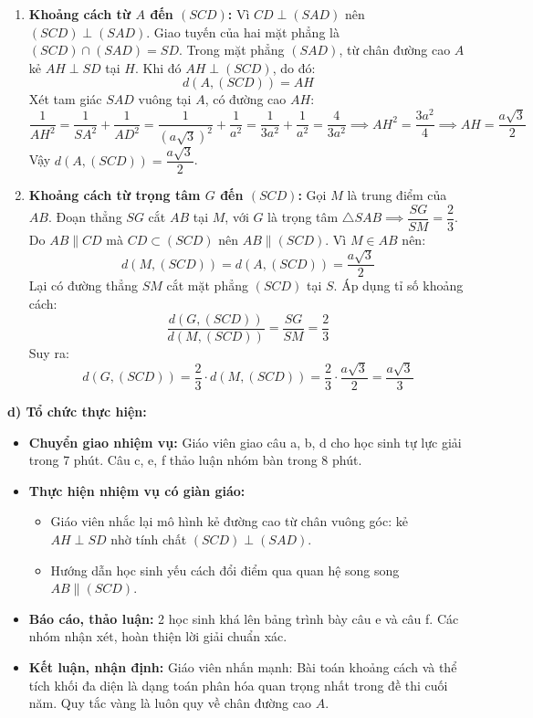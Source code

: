 \documentclass[12pt, a4paper]{article}
\begin{document}
\begin{enumerate}[label=\alph*)]
    \item \textbf{Khoảng cách từ $A$ đến $(SCD)$:}
    Vì $CD \perp (SAD)$ nên $(SCD) \perp (SAD)$. Giao tuyến của hai mặt phẳng là $(SCD) \cap (SAD) = SD$.
    Trong mặt phẳng $(SAD)$, từ chân đường cao $A$ kẻ $AH \perp SD$ tại $H$.
    Khi đó $AH \perp (SCD)$, do đó:
    $$d(A, (SCD)) = AH$$
    Xét tam giác $SAD$ vuông tại $A$, có đường cao $AH$:
    $$\dfrac{1}{AH^2} = \dfrac{1}{SA^2} + \dfrac{1}{AD^2} = \dfrac{1}{(a\sqrt{3})^2} + \dfrac{1}{a^2} = \dfrac{1}{3a^2} + \dfrac{1}{a^2} = \dfrac{4}{3a^2} \implies AH^2 = \dfrac{3a^2}{4} \implies AH = \dfrac{a\sqrt{3}}{2}$$
    Vậy $d(A, (SCD)) = \dfrac{a\sqrt{3}}{2}$.

    \item \textbf{Khoảng cách từ trọng tâm $G$ đến $(SCD)$:}
    Gọi $M$ là trung điểm của $AB$. Đoạn thẳng $SG$ cắt $AB$ tại $M$, với $G$ là trọng tâm $\triangle SAB \implies \dfrac{SG}{SM} = \dfrac{2}{3}$.
    Do $AB \parallel CD$ mà $CD \subset (SCD)$ nên $AB \parallel (SCD)$.
    Vì $M \in AB$ nên:
    $$d(M, (SCD)) = d(A, (SCD)) = \dfrac{a\sqrt{3}}{2}$$
    Lại có đường thẳng $SM$ cắt mặt phẳng $(SCD)$ tại $S$. Áp dụng tỉ số khoảng cách:
    $$\dfrac{d(G, (SCD))}{d(M, (SCD))} = \dfrac{SG}{SM} = \dfrac{2}{3}$$
    Suy ra:
    $$d(G, (SCD)) = \dfrac{2}{3} \cdot d(M, (SCD)) = \dfrac{2}{3} \cdot \dfrac{a\sqrt{3}}{2} = \dfrac{a\sqrt{3}}{3}$$
\end{enumerate}

\noindent \textbf{d) Tổ chức thực hiện:}
\begin{itemize}[leftmargin=0.6cm]
    \item \textbf{Chuyển giao nhiệm vụ:} Giáo viên giao câu a, b, d cho học sinh tự lực giải trong 7 phút. Câu c, e, f thảo luận nhóm bàn trong 8 phút.
    \item \textbf{Thực hiện nhiệm vụ có giàn giáo:}
    \begin{itemize}
        \item Giáo viên nhắc lại mô hình kẻ đường cao từ chân vuông góc: kẻ $AH \perp SD$ nhờ tính chất $(SCD) \perp (SAD)$.
        \item Hướng dẫn học sinh yếu cách đổi điểm qua quan hệ song song $AB \parallel (SCD)$.
    \end{itemize}
    \item \textbf{Báo cáo, thảo luận:} 2 học sinh khá lên bảng trình bày câu e và câu f. Các nhóm nhận xét, hoàn thiện lời giải chuẩn xác.
    \item \textbf{Kết luận, nhận định:} Giáo viên nhấn mạnh: Bài toán khoảng cách và thể tích khối đa diện là dạng toán phân hóa quan trọng nhất trong đề thi cuối năm. Quy tắc vàng là luôn quy về chân đường cao $A$.
\end{itemize}
\end{document}
